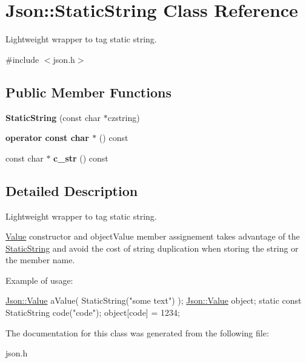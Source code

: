 \hypertarget{class_json_1_1_static_string}{\section{Json\-:\-:Static\-String Class Reference}
\label{class_json_1_1_static_string}
}


Lightweight wrapper to tag static string.  




{\ttfamily \#include $<$json.\-h$>$}

\subsection*{Public Member Functions}
\begin{DoxyCompactItemize}
\item 
\hypertarget{class_json_1_1_static_string_afb6baf1ec078ce76f0b0f9b39d19437f}{{\bfseries Static\-String} (const char $\ast$czstring)}\label{class_json_1_1_static_string_afb6baf1ec078ce76f0b0f9b39d19437f}

\item 
\hypertarget{class_json_1_1_static_string_ac2b334d46bbea4c0227e508fc66433e9}{{\bfseries operator const char $\ast$} () const }\label{class_json_1_1_static_string_ac2b334d46bbea4c0227e508fc66433e9}

\item 
\hypertarget{class_json_1_1_static_string_ab86fc6a3183adf12fdba4b370acf1754}{const char $\ast$ {\bfseries c\-\_\-str} () const }\label{class_json_1_1_static_string_ab86fc6a3183adf12fdba4b370acf1754}

\end{DoxyCompactItemize}


\subsection{Detailed Description}
Lightweight wrapper to tag static string. 

\hyperlink{class_json_1_1_value}{Value} constructor and object\-Value member assignement takes advantage of the \hyperlink{class_json_1_1_static_string}{Static\-String} and avoid the cost of string duplication when storing the string or the member name.

Example of usage\-: 
\begin{DoxyCode}
\hyperlink{class_json_1_1_value}{Json::Value} aValue( StaticString(\textcolor{stringliteral}{"some text"}) );
\hyperlink{class_json_1_1_value}{Json::Value} object;
\textcolor{keyword}{static} \textcolor{keyword}{const} StaticString code(\textcolor{stringliteral}{"code"});
\textcolor{keywordtype}{object}[code] = 1234;
\end{DoxyCode}
 

The documentation for this class was generated from the following file\-:\begin{DoxyCompactItemize}
\item 
json.\-h\end{DoxyCompactItemize}
